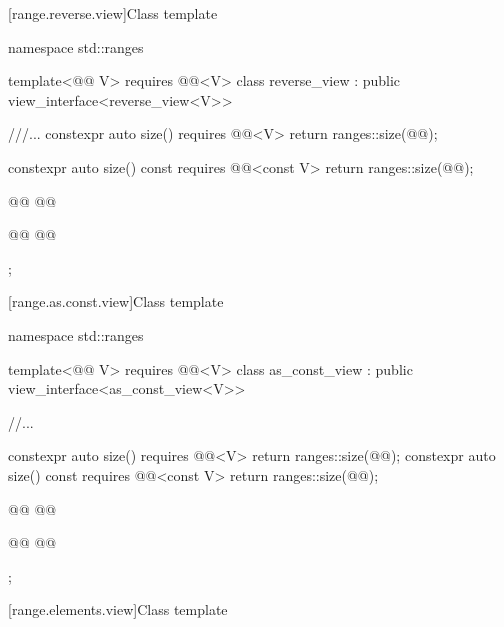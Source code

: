 \documentclass{wg21}
\begin{document}
[range.reverse.view]{Class template }

%
%
%
\begin{codeblock}
namespace std::ranges {
template<@@ V>
requires @@<V>
class reverse_view : public view_interface<reverse_view<V>> {
    ///...
    constexpr auto size() requires @@<V> {
        return ranges::size(@@);
    }

    constexpr auto size() const requires @@<const V> {
        return ranges::size(@@);
    }

    @@
    @@

    @@
    @@
};

}
\end{codeblock}

[range.as.const.view]{Class template }

\begin{codeblock}
namespace std::ranges {
template<@@ V>
requires @@<V>
class as_const_view : public view_interface<as_const_view<V>> {
    //...

    constexpr auto size() requires @@<V> { return ranges::size(@@); }
    constexpr auto size() const requires @@<const V> { return ranges::size(@@); }

    @@
    @@

    @@
    @@
};
}
\end{codeblock}

[range.elements.view]{Class template }
\end{document}
